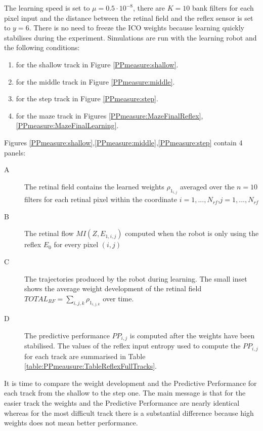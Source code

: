 The learning speed is set to $\mu=0.5 \cdot 10 ^{-8}$, there are $K=10$ bank filters
for each pixel input and the distance between the retinal field and the reflex sensor
is set to $y=6$.
There is no need to freeze the ICO weights because learning quickly stabilises
during the experiment.
Simulations are run with the learning robot and the following conditions:
\begin{enumerate}
\item for the shallow track in Figure \ref{PPmeasure:shallow}.
\item for the middle track in Figure \ref{PPmeasure:middle}.
\item for the step track in Figure \ref{PPmeasure:step}.
\item for the maze track in Figures  \ref{PPmeasure:MazeFinalReflex},\ref{PPmeasure:MazeFinalLearning}.
\end{enumerate}
Figures \ref{PPmeasure:shallow},\ref{PPmeasure:middle},\ref{PPmeasure:step} contain 4 panels:
\begin{description}
 \item[A] The retinal field contains the learned weights $\rho_{1_{i,j}}$ averaged over the $n=10$ filters for each retinal pixel within the coordinate $i=1,...,N_{rf}$,$j=1,...,N_{rf}$
 \item[B] The retinal flow $MI(Z,E_{1,i,j})$ computed when the robot is only using the reflex $E_0$ for every pixel $(i,j)$
 \item[C] The trajectories produced by the robot during learning. The small inset shows the average weight development of the retinal field $TOTAL_{RF}=\sum_{i,j,k} \rho_{1_{i,j,k}}$ over time.
 \item[D] The predictive performance $PP_{i,j}$ is computed after the weights have been stabilised.
	  The values of the reflex input entropy used to compute the $PP_{i,j}$ for each track are 
          summarised in Table \ref{table:PPmeausure:TableReflexFullTracks}.
\end{description}

It is time to compare the weight development and the Predictive Performance for
each track from the shallow to the step one.
The main message is that for the easier track the weights and the Predictive Performance
are nearly identical whereas for the most difficult track there is a substantial difference
because high weights does not mean better performance.
 
